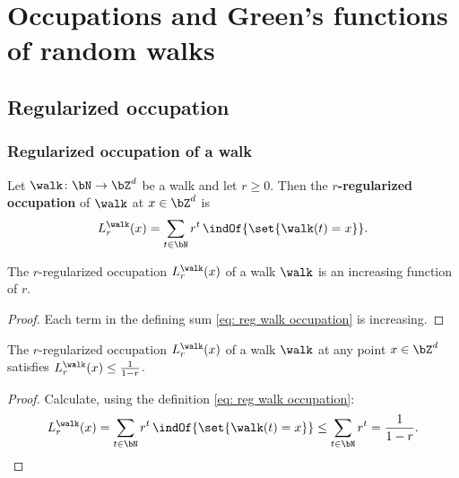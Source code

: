 \chapter{Occupations and Green's functions of random walks}



\section{Regularized occupation}


\subsection*{Regularized occupation of a walk}

\begin{definition}
  \label{def:walkRegOccup}
  \leanok
  Let $\walk \colon \bN \to \bZ^d$ be a walk and let $r \ge 0$.
  Then the \textbf{$r$-regularized occupation}
  of $\walk$ at $x \in \bZ^d$ is
  \begin{align}\label{eq: reg walk occupation}
    L^{\walk}_r(x) = \sum_{t \in \bN} r^t \, \indOf{\set{\walk(t) = x}} .
  \end{align}
\end{definition}

\begin{lemma}
  \label{lem:walkRegOccup_incr}
  \leanok
  The $r$-regularized occupation $L^{\walk}_r(x)$
  of a walk $\walk$ is an increasing
  function of $r$.
\end{lemma}
\begin{proof}
  \leanok
  Each term in the defining sum \eqref{eq: reg walk occupation}
  is increasing.
\end{proof}

\begin{lemma}
  \label{lem:walk_regOcc_geometric_bound}
  \leanok
  The $r$-regularized occupation $L^{\walk}_r(x)$
  of a walk $\walk$ at any point $x \in \bZ^d$
  satisfies $L^{\walk}_r(x) \le \frac{1}{1-r}$.
\end{lemma}
\begin{proof}
  \leanok
  Calculate, using the definition \eqref{eq: reg walk occupation}:
  \begin{align*}
    L^{\walk}_r(x) = \sum_{t \in \bN} r^t \, \indOf{\set{\walk(t) = x}}
    \le \sum_{t \in \bN} r^t = \frac{1}{1-r}.
  \end{align*}
\end{proof}

